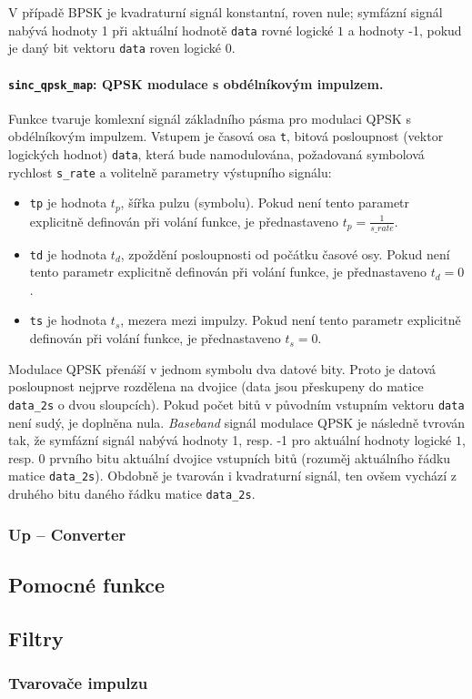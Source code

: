 V případě BPSK je kvadraturní signál konstantní, roven nule; symfázní signál nabývá hodnoty 1 při aktuální hodnotě \texttt{data} rovné logické $1$ a hodnoty -1, pokud je daný bit vektoru \texttt{data} roven logické $0$.   

\paragraph{\texttt{sinc\_qpsk\_map}: QPSK modulace s obdélníkovým impulzem.}
Funkce tvaruje komlexní signál základního pásma pro modulaci QPSK s obdélníkovým impulzem. 
Vstupem je časová osa \texttt{t}, bitová posloupnost (vektor logických hodnot) \texttt{data}, která bude namodulována, požadovaná symbolová rychlost \texttt{s\_rate} a volitelně parametry výstupního signálu:
\begin{itemize}
\item \texttt{tp} je hodnota $t_p$, šířka pulzu (symbolu). Pokud není tento parametr explicitně definován při volání funkce, je přednastaveno $t_p = \frac{1}{s\_rate}$.
\item \texttt{td} je hodnota $t_d$, zpoždění posloupnosti od počátku časové osy. Pokud není tento parametr explicitně definován při volání funkce, je přednastaveno $t_d = 0$.
\item \texttt{ts} je hodnota $t_s$, mezera mezi impulzy. Pokud není tento parametr explicitně definován při volání funkce, je přednastaveno $t_s = 0$.
\end{itemize}

Modulace QPSK přenáší v jednom symbolu dva datové bity. Proto je datová posloupnost nejprve rozdělena na dvojice (data jsou přeskupeny do matice \texttt{data\_2s} o dvou sloupcích). Pokud počet bitů v původním vstupním vektoru \texttt{data} není sudý, je doplněna nula. \textsl{Baseband} signál modulace QPSK je následně tvrován tak, že symfázní signál nabývá hodnoty 1, resp. -1 pro aktuální hodnoty logické $1$, resp. $0$ prvního bitu aktuální dvojice vstupních bitů (rozuměj aktuálního řádku matice \texttt{data\_2s}). Obdobně je tvarován i kvadraturní signál, ten ovšem vychází z druhého bitu daného řádku matice \texttt{data\_2s}.

\subsubsection{Up -- Converter}

\subsection{Pomocné funkce}

\subsection{Filtry}

\subsubsection{Tvarovače impulzu}


